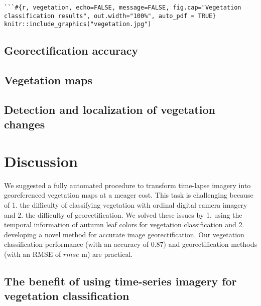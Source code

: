 \documentclass{article}
\begin{document}
\begin{verbatim}
```#{r, vegetation, echo=FALSE, message=FALSE, fig.cap="Vegetation classification results", out.width="100%", auto_pdf = TRUE}
knitr::include_graphics("vegetation.jpg")
\end{verbatim}

\hypertarget{georectification-accuracy}{%
\subsection{Georectification accuracy}\label{georectification-accuracy}}

\hypertarget{vegetation-maps}{%
\subsection{Vegetation maps}\label{vegetation-maps}}

\hypertarget{detection-and-localization-of-vegetation-changes}{%
\subsection{Detection and localization of vegetation changes}\label{detection-and-localization-of-vegetation-changes}}

\hypertarget{discussion}{%
\section{Discussion}\label{discussion}}

We suggested a fully automated procedure to transform time-lapse imagery into georeferenced vegetation maps at a meager cost. This task is challenging because of 1. the difficulty of classifying vegetation with ordinal digital camera imagery and 2. the difficulty of georectification. We solved these issues by 1. using the temporal information of autumn leaf colors for vegetation classification and 2. developing a novel method for accurate image georectification. Our vegetation classification performance (with an accuracy of 0.87) and georectification methods (with an RMSE of \(rmse\) m) are practical.

\hypertarget{the-benefit-of-using-time-series-imagery-for-vegetation-classification}{%
\subsection{The benefit of using time-series imagery for vegetation classification}\label{the-benefit-of-using-time-series-imagery-for-vegetation-classification}}
\end{document}
